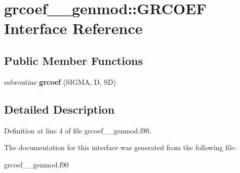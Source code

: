 \hypertarget{interfacegrcoef____genmod_1_1_g_r_c_o_e_f}{\section{grcoef\+\_\+\+\_\+genmod\+:\+:G\+R\+C\+O\+E\+F Interface Reference}
\label{interfacegrcoef____genmod_1_1_g_r_c_o_e_f}
}
\subsection*{Public Member Functions}
\begin{DoxyCompactItemize}
\item 
\hypertarget{interfacegrcoef____genmod_1_1_g_r_c_o_e_f_ad44342cd295c6a4677f27dfb5541385d}{subroutine {\bfseries grcoef} (S\+I\+G\+M\+A, D, S\+D)}\label{interfacegrcoef____genmod_1_1_g_r_c_o_e_f_ad44342cd295c6a4677f27dfb5541385d}

\end{DoxyCompactItemize}


\subsection{Detailed Description}


Definition at line 4 of file grcoef\+\_\+\+\_\+genmod.\+f90.



The documentation for this interface was generated from the following file\+:\begin{DoxyCompactItemize}
\item 
grcoef\+\_\+\+\_\+genmod.\+f90\end{DoxyCompactItemize}
